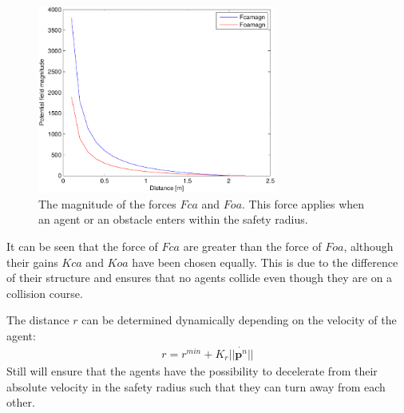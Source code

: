 \begin{figure}[htbp]
  \includegraphics[width=0.7\textwidth]{fig/fcafoa}
  \caption{The magnitude of the forces $Fca$ and $Foa$. This force applies when an agent or an obstacle enters within the safety radius.}
  \label{fig:fcafoa}
\end{figure}

It can be seen that the force of $Fca$ are greater than the force of $Foa$, although their gains $Kca$ and $Koa$ have been chosen equally. This is due to the difference of their structure and ensures that no agents collide even though they are on a collision course.

The distance $r$ can be determined
dynamically depending on the velocity of the agent:
\begin{align}
r = r^{min} + K_r||\dot{\mathbf{p}^n}||
\end{align}
Still will ensure that the agents have the possibility to decelerate from their absolute velocity in the safety radius such that they can turn away from each other.


